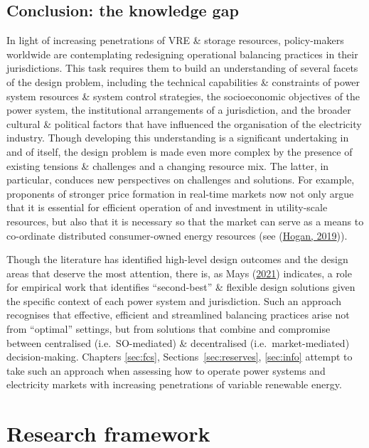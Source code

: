 \documentclass[12pt,a4paper,]{report}
\begin{document}
\hypertarget{sec:lit_review-gap}{%
\section{Conclusion: the knowledge gap}\label{sec:lit_review-gap}}

In light of increasing penetrations of VRE \& storage resources,
policy-makers worldwide are contemplating redesigning operational
balancing practices in their jurisdictions. This task requires them to
build an understanding of several facets of the design problem,
including the technical capabilities \& constraints of power system
resources \& system control strategies, the socioeconomic objectives of
the power system, the institutional arrangements of a jurisdiction, and
the broader cultural \& political factors that have influenced the
organisation of the electricity industry. Though developing this
understanding is a significant undertaking in and of itself, the design
problem is made even more complex by the presence of existing tensions
\& challenges and a changing resource mix. The latter, in particular,
conduces new perspectives on challenges and solutions. For example,
proponents of stronger price formation in real-time markets now not only
argue that it is essential for efficient operation of and investment in
utility-scale resources, but also that it is necessary so that the
market can serve as a means to co-ordinate distributed consumer-owned
energy resources (see
(\protect\hyperlink{ref-hoganMarketDesignPractices2019}{Hogan, 2019})).

Though the literature has identified high-level design outcomes and the
design areas that deserve the most attention, there is, as Mays
(\protect\hyperlink{ref-maysMissingIncentivesFlexibility2021}{2021})
indicates, a role for empirical work that identifies ``second-best'' \&
flexible design solutions given the specific context of each power
system and jurisdiction. Such an approach recognises that effective,
efficient and streamlined balancing practices arise not from ``optimal''
settings, but from solutions that combine and compromise between
centralised (i.e.~SO-mediated) \& decentralised (i.e.~market-mediated)
decision-making. Chapters \ref{sec:fcs},
Sections~\ref{sec:reserves}, \ref{sec:info} attempt to take such an
approach when assessing how to operate power systems and electricity
markets with increasing penetrations of variable renewable energy.

\hypertarget{sec:research_framework}{%
\chapter{Research framework}\label{sec:research_framework}}
\end{document}
